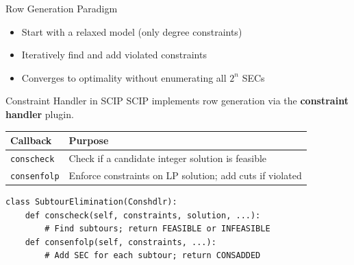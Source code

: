 \documentclass[aspectratio=169]{beamer}
\begin{document}
\begin{frame}{Row Generation Paradigm}
\begin{center}
\end{center}

\medskip
\begin{itemize}
  \item Start with a relaxed model (only degree constraints)
  \item Iteratively find and add violated constraints
  \item Converges to optimality without enumerating all $2^n$ SECs
\end{itemize}
\end{frame}

\begin{frame}[fragile]{Constraint Handler in SCIP}
SCIP implements row generation via the \textbf{constraint handler} plugin.

\medskip
\begin{table}
\centering\small
\begin{tabular}{lp{8cm}}
\toprule
\textbf{Callback} & \textbf{Purpose} \\
\midrule
\texttt{conscheck}  & Check if a candidate integer solution is feasible \\
\texttt{consenfolp} & Enforce constraints on LP solution; add cuts if violated \\
\bottomrule
\end{tabular}
\end{table}

\medskip
\begin{lstlisting}
class SubtourElimination(Conshdlr):
    def conscheck(self, constraints, solution, ...):
        # Find subtours; return FEASIBLE or INFEASIBLE
    def consenfolp(self, constraints, ...):
        # Add SEC for each subtour; return CONSADDED
\end{lstlisting}
\end{frame}
\end{document}
